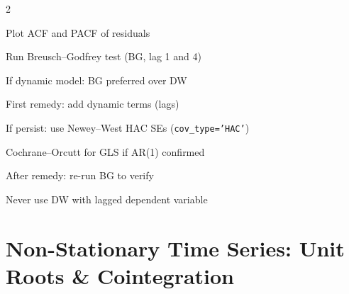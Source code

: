 \documentclass[10pt,a4paper]{article}
\begin{document}
\begin{tcolorbox}[checklist]
\begin{multicols}{2}
\begin{checklist}
  \item Plot ACF and PACF of residuals
  \item Run Breusch--Godfrey test (BG, lag 1 and 4)
  \item If dynamic model: BG preferred over DW
  \item First remedy: add dynamic terms (lags)
  \item If persist: use Newey--West HAC SEs (\texttt{cov\_type='HAC'})
  \item Cochrane--Orcutt for GLS if AR(1) confirmed
  \item After remedy: re-run BG to verify
  \item Never use DW with lagged dependent variable
\end{checklist}
\end{multicols}
\end{tcolorbox}

\section{Non-Stationary Time Series: Unit Roots \& Cointegration}
\end{document}
